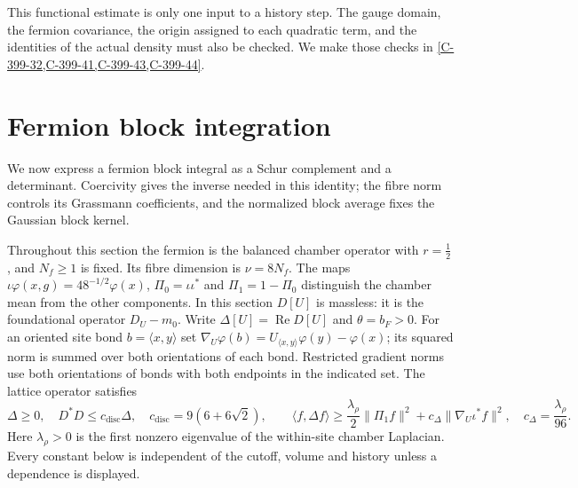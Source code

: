 \documentclass[11pt,letterpaper,reqno]{amsart}
\theoremstyle{definition}
\theoremstyle{remark}
\begin{document}
This functional estimate is only one input to a history step.
The gauge domain, the fermion covariance, the origin assigned
to each quadratic term, and the identities of the actual density
must also be checked. We make those checks in
\cref{C-399-32,C-399-41,C-399-43,C-399-44}.

\section{Fermion block integration}\label{sec:qcd-block-integration}

We now express a fermion block integral as a Schur complement
and a determinant. Coercivity gives the inverse needed in this
identity; the fibre norm controls its Grassmann coefficients,
and the normalized block average fixes the Gaussian block kernel.

Throughout this section the fermion is the balanced chamber operator
with $r=\frac12$, and $N_f\ge1$ is fixed.  Its fibre dimension is
$\nu=8N_f$.  The maps $\iota\varphi(x,g)=48^{-1/2}\varphi(x)$,
$\Pi_0=\iota\iota^*$ and $\Pi_1=1-\Pi_0$ distinguish the chamber mean
from the other components.  In this section $D[U]$ is massless:
it is the foundational operator $D_U-m_0$.
Write $\Delta[U]=\operatorname{Re}D[U]$ and $\theta=b_F>0$.
For an oriented site bond $b=\langle x,y\rangle$ set
$\nabla_U\varphi(b)=U_{\langle x,y\rangle}\varphi(y)-\varphi(x)$;
its squared norm is summed over both orientations of each bond.
Restricted gradient norms use both orientations of bonds with both
endpoints in the indicated set.
The lattice operator satisfies
\[
 \Delta\ge0,\quad D^*D\le c_{\mathrm{disc}}\Delta,
 \quad c_{\mathrm{disc}}=9(6+6\sqrt2),\qquad
 \langle f,\Delta f\rangle\ge
 \frac{\lambda_\rho}{2}\|\Pi_1f\|^2+
 c_\Delta\|\nabla_U\iota^*f\|^2,
 \quad c_\Delta=\frac{\lambda_\rho}{96}.
\]
Here $\lambda_\rho>0$ is the first nonzero eigenvalue of the
within-site chamber Laplacian.  Every constant below is independent
of the cutoff, volume and history unless a dependence is displayed.
\end{document}
